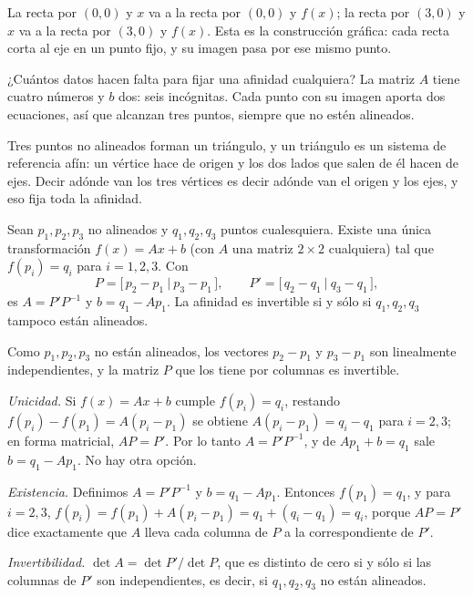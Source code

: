 La recta por \((0,0)\) y \(x\) va a la recta por \((0,0)\) y \(f(x)\); la recta por \((3,0)\) y
\(x\) va a la recta por \((3,0)\) y \(f(x)\). Esta es la construcción gráfica: cada recta corta
al eje en un punto fijo, y su imagen pasa por ese mismo punto.

¿Cuántos datos hacen falta para fijar una afinidad cualquiera? La matriz \(A\) tiene cuatro
números y \(b\) dos: seis incógnitas. Cada punto con su imagen aporta dos ecuaciones, así que
alcanzan tres puntos, siempre que no estén alineados.

\begin{idea}[Idea]
Tres puntos no alineados forman un triángulo, y un triángulo es un sistema de referencia
afín: un vértice hace de origen y los dos lados que salen de él hacen de ejes. Decir adónde
van los tres vértices es decir adónde van el origen y los ejes, y eso fija toda la
afinidad.
\end{idea}

\begin{proposicion}\label{prop:06-tres-puntos}
Sean \(p_1,p_2,p_3\) no alineados y \(q_1,q_2,q_3\) puntos cualesquiera. Existe una única
transformación \(f(x)=Ax+b\) (con \(A\) una matriz \(2\times2\) cualquiera) tal que
\(f(p_i)=q_i\) para \(i=1,2,3\). Con
\[
  P=\bigl[\,p_2-p_1\ \big|\ p_3-p_1\,\bigr],
  \qquad
  P'=\bigl[\,q_2-q_1\ \big|\ q_3-q_1\,\bigr],
\]
es \(A=P'P^{-1}\) y \(b=q_1-Ap_1\). La afinidad es invertible si y sólo si \(q_1,q_2,q_3\)
tampoco están alineados.
\end{proposicion}

\begin{demostracion}
Como \(p_1,p_2,p_3\) no están alineados, los vectores \(p_2-p_1\) y \(p_3-p_1\) son linealmente
independientes, y la matriz \(P\) que los tiene por columnas es invertible.

\emph{Unicidad.} Si \(f(x)=Ax+b\) cumple \(f(p_i)=q_i\), restando
\(f(p_i)-f(p_1)=A(p_i-p_1)\) se obtiene \(A(p_i-p_1)=q_i-q_1\) para \(i=2,3\); en forma matricial,
\(AP=P'\). Por lo tanto \(A=P'P^{-1}\), y de \(Ap_1+b=q_1\) sale \(b=q_1-Ap_1\). No hay otra
opción.

\emph{Existencia.} Definimos \(A=P'P^{-1}\) y \(b=q_1-Ap_1\). Entonces \(f(p_1)=q_1\), y para
\(i=2,3\), \(f(p_i)=f(p_1)+A(p_i-p_1)=q_1+(q_i-q_1)=q_i\), porque \(AP=P'\) dice exactamente que
\(A\) lleva cada columna de \(P\) a la correspondiente de \(P'\).

\emph{Invertibilidad.} \(\det A=\det P'/\det P\), que es distinto de cero si y sólo si las
columnas de \(P'\) son independientes, es decir, si \(q_1,q_2,q_3\) no están alineados.
\end{demostracion}

